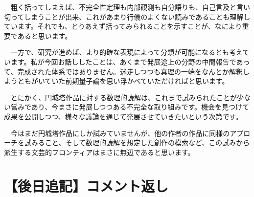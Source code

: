 \documentclass[10pt, a5paper, twoside]{jsarticle}
\begin{document}
\begin{itemize}
			　粗く括ってしまえば、不完全性定理も内部観測も自分語りも、自己言及と言い切ってしまうことが出来、これがあまり行儀のよくない読みであることも理解しています。それでも、とりあえず括ってみられることを示すことが、なにより重要であると思います。

			　一方で、研究が進めば、より的確な表現によって分類が可能になるとも考えています。私が今回お話ししたことは、あくまで発展途上の分野の中間報告であって、完成された体系ではありません。迷走しつつも真理の一端をなんとか解釈しようともがいていた前期量子論を思い浮かべていただければと思います。

			　とにかく、円城塔作品に対する数理的読解は、これまで試みられたことが少ない営みであり、今まさに発展しつつある不完全な取り組みです。機会を見つけて成果を公開しつつ、様々な議論を通じて発展させていきたいという次第です。

			　今はまだ円城塔作品にしか試みていませんが、他の作者の作品に同様のアプローチを試みること、そして数理的読解を想定した創作の模索など、この試みから派生する文芸的フロンティアはまさに無辺であると思います。

		\end{itemize}

	\section{【後日追記】コメント返し}
\end{document}
